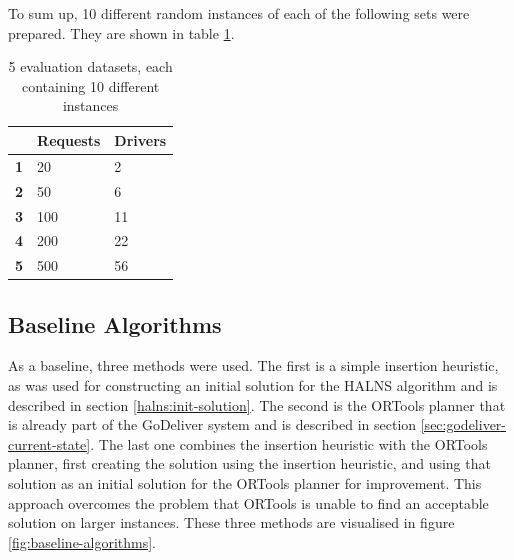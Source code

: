    To sum up, 10 different random instances of each of the following sets were prepared. They are shown in table \ref{tab:datasets}.
    
    \begin{table}[!ht]
    \centering
    {\renewcommand{\arraystretch}{1.5}
    \begin{tabular}{lll}
    \hline
               & \textbf{Requests} & \textbf{Drivers} \\ \hline
    \textbf{1} & 20                & 2                \\
    \textbf{2} & 50                & 6                \\
    \textbf{3} & 100               & 11               \\
    \textbf{4} & 200               & 22               \\
    \textbf{5} & 500               & 56              
    \end{tabular}}
    \caption{5 evaluation datasets, each containing 10 different instances}
    \label{tab:datasets}
    \end{table}

    
    \subsection{Baseline Algorithms} \label{sec:baseline}
    
    As a baseline, three methods were used. The first is a simple insertion heuristic, as was used for constructing an initial solution for the HALNS algorithm and is described in section \ref{halns:init-solution}. The second is the ORTools planner that is already part of the GoDeliver system and is described in section \ref{sec:godeliver-current-state}. The last one combines the insertion heuristic with the ORTools planner, first creating the solution using the insertion heuristic, and using that solution as an initial solution for the ORTools planner for improvement. This approach overcomes the problem that ORTools is unable to find an acceptable solution on larger instances. These three methods are visualised in figure \ref{fig:baseline-algorithms}.
    
